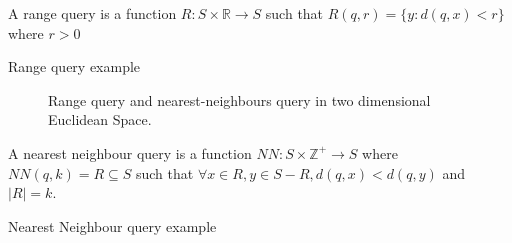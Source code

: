 \begin{mydef}
A range query is a function $R: S \times \mathbb{R} \rightarrow S$ such that $R(q, r) = \{y : d(q, x) < r\}$ where $r > 0$
\end{mydef}
%
\begin{myexample}{Range query example}
\end{myexample}
%
\begin{figure}
\centering
{} \quad
{}
\caption[Range query and nearest-neighbours query in two dimensional Euclidean Space.]{Range query and nearest-neighbours query in two dimensional Euclidean Space.}
\end{figure}
%
\begin{mydef}
A nearest neighbour query is a function $NN:S \times \mathbb{Z}^+ \rightarrow S $ where $NN(q, k) = R \subseteq S$ such that $\forall x \in R, y \in S - R, d(q, x) < d(q,y) $ and $ |R| = k$.
\end{mydef}
%
\begin{myexample}{Nearest Neighbour query example}
\end{myexample}
